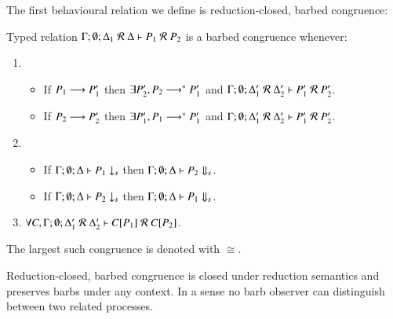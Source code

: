 The first behavioural relation we define is reduction-closed, barbed congruence:
%
\begin{definition}\rm
	Typed relation $\Gamma; \emptyset; \Delta_1\ \mathcal{R}\ \Delta \vdash P_1 \ \mathcal{R}\ P_2$ is a barbed congruence
	whenever:
	\begin{enumerate}
		\item
		\begin{itemize}
			\item	If $P_1 \longrightarrow P_1'$ then $\exists P_2', P_2 \longrightarrow^* P_1'$ and $\Gamma; \emptyset; \Delta_1'\ \mathcal{R}\ \Delta_2' \proves P_1'\ \mathcal{R}\ P_2'$.
			\item	If $P_2 \longrightarrow P_2'$ then $\exists P_1', P_1 \longrightarrow^* P_1'$ and $\Gamma; \emptyset; \Delta_1'\ \mathcal{R}\ \Delta_2' \proves P_1'\ \mathcal{R}\ P_2'$.
		\end{itemize}
		\item
		\begin{itemize}
			\item	If $\Gamma;\emptyset;\Delta \vdash P_1 \downarrow_{s}$ then $\Gamma;\emptyset;\Delta \vdash P_2 \Downarrow_{s}$.
			\item	If $\Gamma;\emptyset;\Delta \vdash P_2 \downarrow_{s}$ then $\Gamma;\emptyset;\Delta \vdash P_1 \Downarrow_{s}$.
		\end{itemize}
		\item	$\forall C, \Gamma; \emptyset; \Delta_1'\ \mathcal{R}\ \Delta_2' \proves \context{C}{P_1}\ \mathcal{R}\ \context{C}{P_2}$.
	\end{enumerate}
	The largest such congruence is denoted with $\cong$.
\end{definition}
%
Reduction-closed, barbed congruence is closed under reduction semantics and 
preserves barbs under any context. In a sense no barb observer can distinguish
between two related processes.

